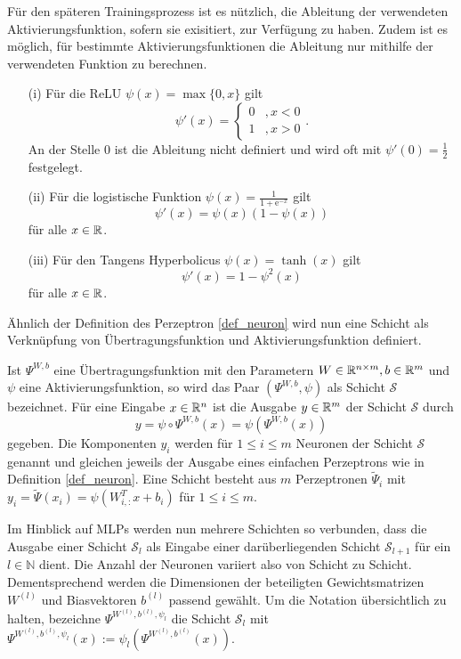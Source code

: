 Für den späteren Trainingsprozess ist es nützlich, die Ableitung der verwendeten Aktivierungsfunktion, sofern sie exisitiert, zur Verfügung zu haben. Zudem ist es möglich, für bestimmte Aktivierungsfunktionen die Ableitung nur mithilfe der verwendeten Funktion zu berechnen.

\begin{lem}
    \begin{itemize}
        \item[(i)] Für die ReLU $\psi(x)=\max\{0,x\}$ gilt
         \[\psi'(x)=\begin{cases}
            0 &, x <0 \\
            1 &, x >0
        \end{cases}. 
        \]
        An der Stelle 0 ist die Ableitung nicht definiert und wird oft mit $\psi'(0)=\frac{1}{2}$ festgelegt.
        \item[(ii)] Für die logistische Funktion $\psi(x)=\frac{1}{1+\mathrm{e}^{-x}}$ gilt
        \[ 
            \psi'(x)=\psi(x)(1-\psi(x)) 
        \]
        für alle $x \in \mathbb{R}$.
        \item[(iii)] Für den Tangens Hyperbolicus $\psi(x)=\tanh(x)$ gilt
        \[ 
            \psi'(x)=1-\psi^2(x) 
        \]
        für alle $x \in \mathbb{R}$.
    \end{itemize}
\end{lem}


Ähnlich der Definition des Perzeptron \ref{def_neuron} wird nun eine Schicht als Verknüpfung von Übertragungsfunktion und Aktivierungsfunktion definiert.

\begin{defi}[Neuronenschicht]
    Ist $\Psi^{W,b}$ eine Übertragungsfunktion mit den Parametern $W \in \mathbb{R}^{n \times m}, b \in \mathbb{R}^m$ und $\psi$ eine Aktivierungsfunktion, so wird das Paar $(\Psi^{W,b}, \psi)$ als Schicht $\mathcal{S}$ bezeichnet. Für eine Eingabe $x \in \mathbb{R}^n$ ist die Ausgabe $y \in \mathbb{R}^m$ der Schicht $\mathcal{S}$ durch
    \[y=\psi \circ \Psi^{W,b}(x)= \psi\left(\Psi^{W,b}(x)\right)
        \] 
        gegeben. Die Komponenten $y_i$ werden für $1 \leq i \leq m$ Neuronen der Schicht $\mathcal{S}$ genannt und gleichen jeweils der Ausgabe eines einfachen Perzeptrons wie in Definition \ref{def_neuron}. Eine Schicht besteht aus $m$ Perzeptronen $\tilde{\Psi}_i$ mit $y_i=\tilde{\Psi}(x_i)=\psi(W_{i,:}^T x+b_i)$ für $1 \leq i \leq m$.
\end{defi}
Im Hinblick auf MLPs werden nun mehrere Schichten so verbunden, dass die Ausgabe einer Schicht $\mathcal{S}_l$ als Eingabe einer darüberliegenden Schicht $\mathcal{S}_{l+1}$ für ein $l \in \mathbb{N}$ dient. Die Anzahl der Neuronen variiert also von Schicht zu Schicht. Dementsprechend werden die Dimensionen der beteiligten Gewichtsmatrizen $W^{(l)}$ und Biasvektoren $b^{(l)}$ passend gewählt. 
Um die Notation übersichtlich zu halten, bezeichne $\Psi^{W^{(l)},b^{(l)},\psi_{l}}$ die Schicht $\mathcal{S}_l$ mit $\Psi^{W^{(l)},b^{(l)},\psi_{l}}(x):= \psi_{l} \left(\Psi^{W^{(l)},b^{(l)}}(x)\right)$.

